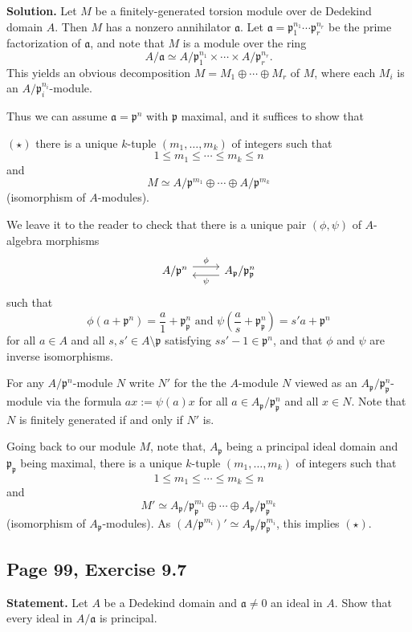 \documentclass[parskip=half,fontsize=12pt]{scrartcl}%
\newcommand{\mf}{\mathfrak}
\newcommand{\aaa}{\mf a}
\newcommand{\ppp}{\mf p}
\begin{document}
\textbf{Solution.} Let $M$ be a finitely-generated torsion module over de Dedekind domain $A$. Then $M$ has a nonzero annihilator $\aaa$. Let $\aaa=\ppp_1^{n_1}\cdots\ppp_r^{n_r}$ be the prime factorization of $\aaa$, and note that $M$ is a module over the ring 
$$
A/\aaa\simeq A/\ppp_1^{n_1}\times\cdots\times A/\ppp_r^{n_r}. 
$$ 
This yields an obvious decomposition $M=M_1\oplus\cdots\oplus M_r$ of $M$, where each $M_i$ is an $A/\ppp_i^{n_i}$-module. 

Thus we can assume $\aaa=\ppp^n$ with $\ppp$ maximal, and it suffices to show that 

$(\star)$ there is a unique $k$-tuple $(m_1,\dots,m_k)$ of integers such that 
$$
1\le m_1\le\cdots\le m_k\le n
$$ 
and 
$$
M\simeq A/\ppp^{m_1}\oplus\cdots\oplus A/\ppp^{m_k}
$$ 
(isomorphism of $A$-modules).

We leave it to the reader to check that there is a unique pair $(\phi,\psi)$ of $A$-algebra morphisms 
$$
\begin{tikzcd}
A/\ppp^n\ar[r,yshift=0.9ex,"\phi"]&A_\ppp/\ppp_\ppp^n\ar[l,yshift=-0.9ex,"\psi"]
\end{tikzcd}
$$ 
such that 
$$
\phi(a+\ppp^n)=\frac a1+\ppp_\ppp^n\text{ and }\psi\left(\frac as+\ppp_\ppp^n\right)=s'a+\ppp^n
$$ 
for all $a\in A$ and all $s,s'\in A\setminus\ppp$ satisfying $ss'-1\in\ppp^n$, and that $\phi$ and $\psi$ are inverse isomorphisms. 

For any $A/\ppp^n$-module $N$ write $N'$ for the the $A$-module $N$ viewed as an $A_\ppp/\ppp_\ppp^n$-module via the formula $ax:=\psi(a)x$ for all $a\in A_\ppp/\ppp_\ppp^n$ and all $x\in N$. Note that $N$ is finitely generated if and only if $N'$ is.  

Going back to our module $M$, note that, $A_\ppp$ being a principal ideal domain and $\ppp_\ppp$ being maximal, there is a unique $k$-tuple $(m_1,\dots,m_k)$ of integers such that 
$$
1\le m_1\le\cdots\le m_k\le n
$$ 
and 
$$
M'\simeq A_\ppp/\ppp_\ppp^{m_1}\oplus\cdots\oplus A_\ppp/\ppp_\ppp^{m_k}
$$ 
(isomorphism of $A_\ppp$-modules). As $(A/\ppp^{m_i})'\simeq A_\ppp/\ppp_\ppp^{m_i}$, this implies $(\star)$. 

\subsection{Page 99, Exercise 9.7}%

\textbf{Statement.} Let $A$ be a Dedekind domain and $\aaa\ne0$ an ideal in $A$. Show that every ideal in $A/\aaa$ is principal.
\end{document}
